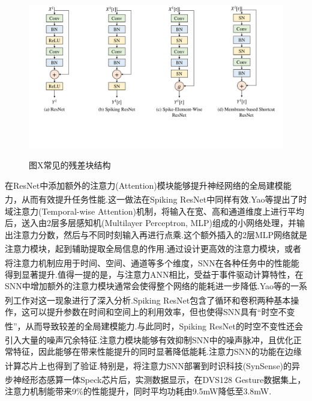 \documentclass[10.5pt,compsoc,UTF8]{CjC}
\theoremstyle{mystyle}
\newcommand{\upcite}[1]{\textsuperscript{\cite{#1}}}
\begin{document}
\begin{multicols}{1}
\begin{figure}[H]
	\centerline{\includegraphics[width=1.\textwidth,trim=0 110 0 0,clip]{./data/res_block.pdf}}
	{图X\quad 常见的残差块结构}
	\label{fig: res block}
\end{figure}

在ResNet中添加额外的注意力(Attention)模块能够提升神经网络的全局建模能力，从而有效提升任务性能\upcite{graves2014generatingsequencesrecurrentneural, bahdanau2014neural, vaswani2017attention}.这一做法在Spiking ResNet中同样有效.Yao等\upcite{Yao_2021_ICCV}提出了时域注意力(Temporal-wise Attention)机制，将输入在宽、高和通道维度上进行平均后，送入由2层多层感知机(Multilayer Perceptron, MLP)组成的小网络处理，并输出注意力分数，然后与不同时刻输入再进行点乘.这个额外插入的2层MLP网络就是注意力模块，起到辅助提取全局信息的作用.通过设计更高效的注意力模块\upcite{Yao_2023_ICCV,yao2023sparser,xu2023enhancing}，或者将注意力机制应用于时间、空间、通道等多个维度\upcite{10032591,zhu2022tcja}，SNN在各种任务中的性能能得到显著提升.值得一提的是，与注意力ANN相比，受益于事件驱动计算特性，在SNN中增加额外的注意力模块通常会使得整个网络的能耗进一步降低.Yao等的一系列工作\upcite{yao2023sparser,10032591,Yao_2023_ICCV,Yao2024}对这一现象进行了深入分析.Spiking ResNet包含了循环和卷积两种基本操作，这可以提升参数在时间和空间上的利用效率，但也使得SNN具有“时空不变性\upcite{huang2022tada}”，从而导致较差的全局建模能力\upcite{wang2018non}.与此同时，Spiking ResNet的时空不变性还会引入大量的噪声冗余特征\upcite{Yao_2023_ICCV}.注意力模块能够有效抑制SNN中的噪声脉冲，且优化正常特征，因此能够在带来性能提升的同时显著降低能耗.注意力SNN的功能在边缘计算芯片上也得到了验证\upcite{Yao2024,kim2023c,chang202373}.特别是，将注意力SNN部署到时识科技(SynSense)的异步神经形态感算一体Speck芯片\upcite{Yao2024}后，实测数据显示，在DVS128 Gesture数据集上，注意力机制能带来9\%的性能提升，同时平均功耗由9.5mW降低至3.8mW.



\end{multicols}
\end{document}

